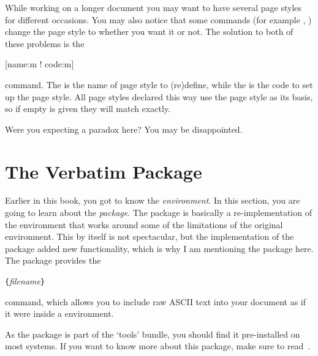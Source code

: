 While working on a longer document you may want to have several page styles for
different occasions. You may also notice that some commands (for example
, ) change the page style to  whether
you want it or not. The solution to both of these problems is the
\begin{lscommand}
  [name:m ! code:m]
\end{lscommand}
command. The  is the name of page style to (re)define, while the %
 is the code to set up the page style. All page styles declared this
way use the  page style as its basis, so if empty  is
given they will match  exactly.
 \begin{example}[standalone, paperheight=3cm]
\geometry{includehead, includefoot, headsep=.5em, footskip=1em} %
\sloppy %
\usepackage{fancyhdr}%
\usepackage{extramarks}%
\pagestyle{mine}

Were you expecting a paradox here?
\noindent
You may be disappointed.

\end{example}

\section{The Verbatim Package}

Earlier in this book, you got to know the 
\emph{environment}.  In this section, you are going to learn about the
 \emph{package}. The  package is basically
a re-implementation of the  environment that works around
some of the limitations of the original  environment.
This by itself is not spectacular, but the implementation of the
 package added new functionality, which is
why I am mentioning the package here. The 
package provides the

\begin{lscommand}
\verb|{|\emph{filename}\verb|}|
\end{lscommand}

\noindent command, which allows you to include raw ASCII text into your
document as if it were inside a  environment.

As the  package is part of the `tools' bundle, you
should find it pre-installed on most systems. If you want to know more
about this package, make sure to read~\cite{verbatim}.


